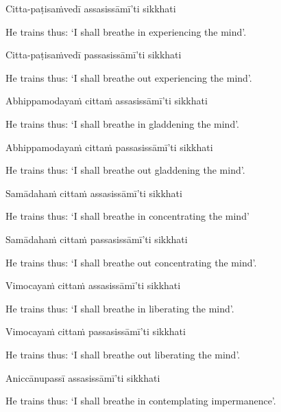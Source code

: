 Citta-paṭisaṁvedī assasissāmī'ti sikkhati

\begin{english}
  He trains thus: `I shall breathe in experiencing the mind'.
\end{english}

Citta-paṭisaṁvedī passasissāmī'ti sikkhati

\begin{english}
  He trains thus: `I shall breathe out experiencing the mind'.
\end{english}

Abhippamodayaṁ cittaṁ assasissāmī'ti sikkhati

\begin{english}
  He trains thus: `I shall breathe in gladdening the mind'.
\end{english}

Abhippamodayaṁ cittaṁ passasissāmī'ti sikkhati

\begin{english}
  He trains thus: `I shall breathe out gladdening the mind'.
\end{english}

Samādahaṁ cittaṁ assasissāmī'ti sikkhati

\begin{english}
  He trains thus: `I shall breathe in concentrating the mind'
\end{english}

Samādahaṁ cittaṁ passasissāmī'ti sikkhati

\begin{english}
  He trains thus: `I shall breathe out concentrating the mind'.
\end{english}

Vimocayaṁ cittaṁ assasissāmī'ti sikkhati

\begin{english}
  He trains thus: `I shall breathe in liberating the mind'.
\end{english}

Vimocayaṁ cittaṁ passasissāmī'ti sikkhati

\begin{english}
  He trains thus: `I shall breathe out liberating the mind'.
\end{english}

Aniccānupassī assasissāmī'ti sikkhati

\begin{english}
  He trains thus: `I shall breathe in contemplating impermanence'.
\end{english}

